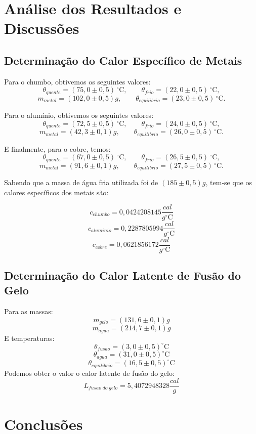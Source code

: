 \documentclass[12pt,a4paper]{article}
\begin{document}
\section{Análise dos Resultados e Discussões}


\subsection{Determinação do Calor Específico de Metais}

Para o chumbo, obtivemos os seguintes valores:
$$ \theta_{quente} = (75,0 \pm 0,5)\,^{\circ}\mathrm{C}, \qquad \theta_{frio} = (22,0 \pm 0,5)\,^{\circ}\mathrm{C}, $$
$$ m_{metal} = (102,0 \pm 0,5)g, \qquad \theta_{equilibrio} = (23,0 \pm 0,5)\,^{\circ}\mathrm{C}. $$


Para o alumínio, obtivemos os seguintes valores:
$$ \theta_{quente} = (72,5 \pm 0,5)\,^{\circ}\mathrm{C}, \qquad \theta_{frio} = (24,0 \pm 0,5)\,^{\circ}\mathrm{C}, $$
$$ m_{metal} = (42,3 \pm 0,1)g, \qquad \theta_{equilibrio} = (26,0 \pm 0,5)\,^{\circ}\mathrm{C}. $$


 E finalmente, para o cobre, temos:
$$ \theta_{quente} = (67,0 \pm 0,5)\,^{\circ}\mathrm{C}, \qquad \theta_{frio} = (26,5 \pm 0,5)\,^{\circ}\mathrm{C}, $$
$$ m_{metal} = (91,6 \pm 0,1)g, \qquad \theta_{equilibrio} = (27,5 \pm 0,5)\,^{\circ}\mathrm{C}. $$

Sabendo que a massa de água fria utilizada foi de $(185 \pm 0,5)g$, tem-se que os calores específicos dos metais são:


$$ c_{chumbo} = 0,0424208145 \dfrac{cal}{g^{\circ}\mathrm{C}}$$
$$ c_{aluminio} = 0,2287805994 \dfrac{cal}{g^{\circ}\mathrm{C}}$$
$$ c_{cobre} = 0,0621856172 \dfrac{cal}{g^{\circ}\mathrm{C}}$$

\subsection{Determinação do Calor Latente de Fusão do Gelo}

Para as massas:
$$ m_{gelo} = (131,6 \pm 0,1) g $$
$$ m_{agua} = (214,7 \pm 0,1)g $$
E temperaturas:
$$ \theta_{fusao} = (3,0 \pm 0,5)^{\circ}\mathrm{C} $$
$$ \theta_{agua} = (31,0 \pm 0,5)^{\circ}\mathrm{C} $$
$$ \theta_{equilibrio} = (16,5 \pm 0,5)^{\circ}\mathrm{C} $$
Podemos obter o valor o calor latente de fusão do gelo:
$$ L_{fusao\;do\;gelo} = 5,4072948328 \dfrac{cal}{g}$$

\section{Conclusões}
\end{document}
